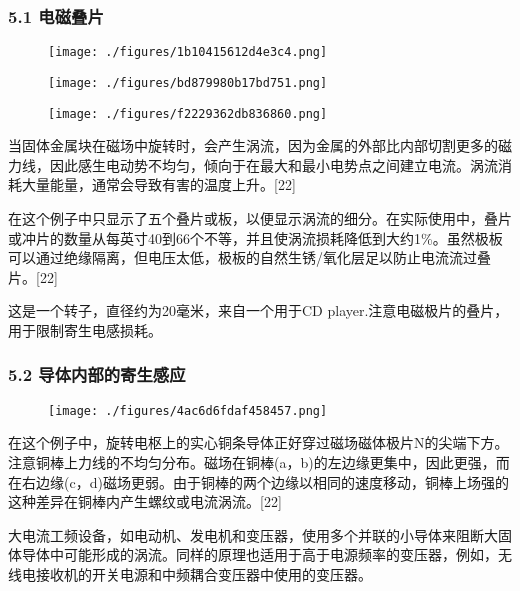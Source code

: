 \subsubsection{5.1 电磁叠片}
\begin{figure}[ht]
\centering
\texttt{[image: ./figures/1b10415612d4e3c4.png]}
\caption\label{fig_DCGY_9}
\end{figure}
\begin{figure}[ht]
\centering
\texttt{[image: ./figures/bd879980b17bd751.png]}
\caption \label{fig_DCGY_10}
\end{figure}
\begin{figure}[ht]
\centering
\texttt{[image: ./figures/f2229362db836860.png]}
\caption\label{fig_DCGY_11}
\end{figure}
当固体金属块在磁场中旋转时，会产生涡流，因为金属的外部比内部切割更多的磁力线，因此感生电动势不均匀，倾向于在最大和最小电势点之间建立电流。涡流消耗大量能量，通常会导致有害的温度上升。[22]

在这个例子中只显示了五个叠片或板，以便显示涡流的细分。在实际使用中，叠片或冲片的数量从每英寸40到66个不等，并且使涡流损耗降低到大约1\%。虽然极板可以通过绝缘隔离，但电压太低，极板的自然生锈/氧化层足以防止电流流过叠片。[22]

这是一个转子，直径约为20毫米，来自一个用于CD player.注意电磁极片的叠片，用于限制寄生电感损耗。
\subsubsection{5.2 导体内部的寄生感应}
\begin{figure}[ht]
\centering
\texttt{[image: ./figures/4ac6d6fdaf458457.png]}
\caption\label{fig_DCGY_12}
\end{figure}
在这个例子中，旋转电枢上的实心铜条导体正好穿过磁场磁体极片N的尖端下方。注意铜棒上力线的不均匀分布。磁场在铜棒(a，b)的左边缘更集中，因此更强，而在右边缘(c，d)磁场更弱。由于铜棒的两个边缘以相同的速度移动，铜棒上场强的这种差异在铜棒内产生螺纹或电流涡流。[22]

大电流工频设备，如电动机、发电机和变压器，使用多个并联的小导体来阻断大固体导体中可能形成的涡流。同样的原理也适用于高于电源频率的变压器，例如，无线电接收机的开关电源和中频耦合变压器中使用的变压器。
